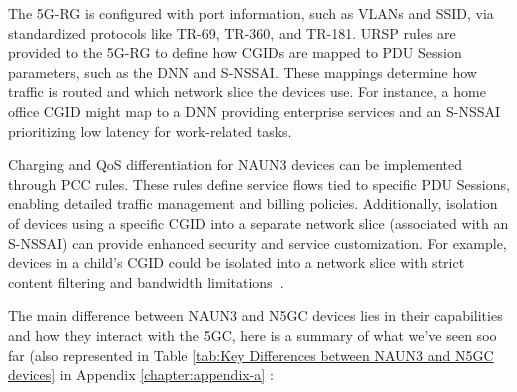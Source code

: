 The \ac{5G-RG} is configured with port information, such as \acp{VLAN} and \ac{SSID}, via standardized protocols like TR-69, TR-360, and TR-181. \ac{URSP} rules are provided to the \ac{5G-RG} to define how \acp{CGID} are mapped to \ac{PDU} Session parameters, such as the \ac{DNN} and \ac{S-NSSAI}. These mappings determine how traffic is routed and which network slice the devices use. For instance, a home office \ac{CGID} might map to a \ac{DNN} providing enterprise services and an \ac{S-NSSAI} prioritizing low latency for work-related tasks.

Charging and \ac{QoS} differentiation for \ac{NAUN3} devices can be implemented through \ac{PCC} rules. These rules define service flows tied to specific \ac{PDU} Sessions, enabling detailed traffic management and billing policies. Additionally, isolation of devices using a specific \ac{CGID} into a separate network slice (associated with an \ac{S-NSSAI}) can provide enhanced security and service customization. For example, devices in a child’s \ac{CGID} could be isolated into a network slice with strict content filtering and bandwidth limitations~\cite{23.316-p27}.

The main difference between \ac{NAUN3} and \ac{N5GC} devices lies in their capabilities and how they interact with the \ac{5GC}, here is a summary of what we've seen soo far (also represented in Table \ref{tab:Key Differences between NAUN3 and N5GC devices} in Appendix \ref{chapter:appendix-a}
:


